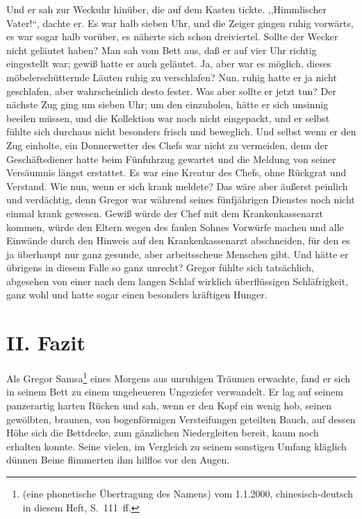 Und er sah zur Weckuhr hinüber, die auf dem Kasten tickte. ,,Himmlischer Vater!{}``, dachte er. Es war halb sieben Uhr, und die Zeiger gingen ruhig vorwärts, es war sogar halb vorüber, es näherte sich schon dreiviertel. Sollte der Wecker nicht geläutet haben? Man sah vom Bett aus, daß er auf vier Uhr richtig eingestellt war; gewiß hatte er auch geläutet. Ja, aber war es möglich, dieses möbelerschütternde Läuten ruhig zu verschlafen? Nun, ruhig hatte er ja nicht geschlafen, aber wahrscheinlich desto fester. Was aber sollte er jetzt tun? Der nächste Zug ging um sieben Uhr; um den einzuholen, hätte er sich unsinnig beeilen müssen, und die Kollektion war noch nicht eingepackt, und er selbst fühlte sich durchaus nicht besonders frisch und beweglich. Und selbst wenn er den Zug einholte, ein Donnerwetter des Chefs war nicht zu vermeiden, denn der Geschäftsdiener hatte beim Fünfuhrzug gewartet und die Meldung von seiner Versäumnis längst erstattet. Es war eine Kreatur des Chefs, ohne Rückgrat und Verstand. Wie nun, wenn er sich krank meldete? Das wäre aber äußerst peinlich und verdächtig, denn Gregor war während seines fünfjährigen Dienstes noch nicht einmal krank gewesen. Gewiß würde der Chef mit dem Krankenkassenarzt kommen, würde den Eltern wegen des faulen Sohnes Vorwürfe machen und alle Einwände durch den Hinweis auf den Krankenkassenarzt abschneiden, für den es ja überhaupt nur ganz gesunde, aber arbeitsscheue Menschen gibt. Und hätte er übrigens in diesem Falle so ganz unrecht? Gregor fühlte sich tatsächlich, abgesehen von einer nach dem langen Schlaf wirklich überflüssigen Schläfrigkeit, ganz wohl und hatte sogar einen besonders kräftigen Hunger.

\section{II. Fazit}

Als Gregor Samsa\footnote{ (eine phonetische Übertragung des Namens) vom 1.1.2000, chinesisch-deutsch in diesem Heft, S.~111~ff.} eines Morgens aus unruhigen Träumen erwachte, fand er sich in seinem Bett zu einem ungeheueren Ungeziefer verwandelt. Er lag auf seinem panzerartig harten Rücken und sah, wenn er den Kopf ein wenig hob, seinen gewölbten, braunen, von bogenförmigen Versteifungen geteilten Bauch, auf dessen Höhe sich die Bettdecke, zum gänzlichen Niedergleiten bereit, kaum noch erhalten konnte. Seine vielen, im Vergleich zu seinem sonstigen Umfang kläglich dünnen Beine flimmerten ihm hilflos vor den Augen.

